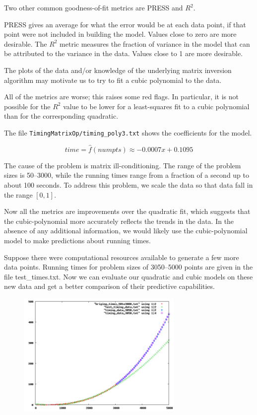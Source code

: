 \documentclass{article}
\begin{document}
Two other common goodness-of-fit metrics are PRESS and $R^2$.

PRESS gives an average for what the error would be at each data point, if that
point were not included in building the model.  Values close to zero are more
desirable.  The $R^2$ metric measures the fraction of variance in the model
that can be attributed to the variance in the data.  Values close to 1 are more
desirable.

The plots of the data and/or knowledge of the underlying matrix inversion
algorithm may motivate us to try to fit a cubic polynomial to the data.



All of the metrics are worse; this raises some red flags.  In particular, it is
not possible for the $R^2$ value to be lower for a least-squares fit to a
cubic polynomial than for the corresponding quadratic.

The file \texttt{TimingMatrixOp/timing\_poly3.txt} shows the coefficients for the model.




\[ time = \hat{f}(numpts) \approx - 0.0007x + 0.1095 \]

The cause of the problem is matrix ill-conditioning.  The range of the problem
sizes is 50--3000, while the running times range from a fraction of a second up
to about 100 seconds.  To address this problem, we scale the data so that data
fall in the range $[0,1]$.



Now all the metrics are improvements over the quadratic fit, which suggests that
the cubic-polynomial more accurately reflects the trends in the data.  In the
absence of any additional information, we would likely use the cubic-polynomial
model to make predictions about running times.

Suppose there were computational resources available to generate a few more data
points.  Running times for problem sizes of 3050--5000 points are given in the
file test\_times.txt.  Now we can evaluate our quadratic and cubic models on
these new data and get a better comparison of their predictive capabilities.



\begin{figure}[htbp]
\centering \includegraphics[width=8cm]{TimingMatrixOp/timing_poly2_0to5000_estimates.png}
\end{figure}
\end{document}
